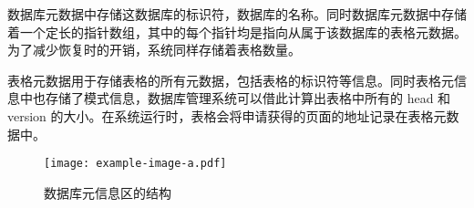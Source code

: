 数据库元数据中存储这数据库的标识符，数据库的名称。同时数据库元数据中存储着一个定长的指针数组，其中的每个指针均是指向从属于该数据库的表格元数据。为了减少恢复时的开销，系统同样存储着表格数量。

表格元数据用于存储表格的所有元数据，包括表格的标识符等信息。同时表格元信息中也存储了模式信息，数据库管理系统可以借此计算出表格中所有的 head 和 version 的大小。在系统运行时，表格会将申请获得的页面的地址记录在表格元数据中。

\begin{figure}
    \centering
    \texttt{[image: example-image-a.pdf]}
    \caption{数据库元信息区的结构}
    \label{fig:catalog}
\end{figure}

